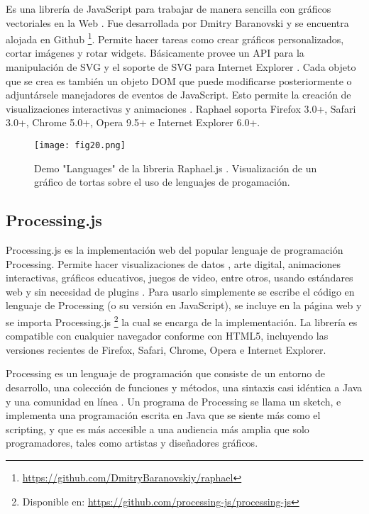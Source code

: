 Es una librería de JavaScript para trabajar de manera sencilla con gráficos vectoriales en la Web \cite{RaphJS}. Fue desarrollada por Dmitry Baranovski y se encuentra alojada en Github \footnote{\url{https://github.com/DmitryBaranovskiy/raphael}}. Permite hacer tareas como crear gráficos personalizados, cortar imágenes y rotar widgets. Básicamente provee un API para la manipulación de SVG y el soporte de SVG para Internet Explorer \cite{Bar09}. Cada objeto que se crea es también un objeto DOM que puede modificarse posteriormente o adjuntársele manejadores de eventos de JavaScript. Esto permite la creación de visualizaciones interactivas y animaciones . Raphael soporta Firefox 3.0+, Safari 3.0+, Chrome 5.0+, Opera 9.5+ e Internet Explorer 6.0+.

\begin{figure}[htp]
  \centering
  \texttt{[image: fig20.png]}
  \caption[Demo "Languages" de la libreria Raphael.js]{Demo "Languages" de la libreria Raphael.js \protect\footnotemark. Visualización de un gráfico de tortas sobre el uso de lenguajes de progamación.}
  \label{fig:fig20}
\end{figure}


\subsection{Processing.js}

Processing.js es la implementación web del popular lenguaje de programación Processing. Permite hacer visualizaciones de datos , arte digital, animaciones interactivas, gráficos educativos, juegos de video, entre otros, usando estándares web y sin necesidad de plugins \cite{ProcJS}. Para usarlo simplemente se escribe el código en lenguaje de Processing (o su versión en JavaScript), se incluye en la página web y se importa Processing.js \footnote{Disponible en: \url{https://github.com/processing-js/processing-js}} la cual se encarga de la implementación. La librería es compatible con cualquier navegador conforme con HTML5, incluyendo las versiones recientes de Firefox, Safari, Chrome, Opera e Internet Explorer.

Processing es un lenguaje de programación que consiste de un entorno de desarrollo, una colección de funciones y métodos, una sintaxis casi idéntica a Java y una comunidad en línea \cite{Fry07}. Un programa de Processing se llama un sketch, e implementa una programación escrita en Java que se siente más como el scripting, y que es más accesible a una audiencia más amplia que solo programadores, tales como artistas y diseñadores gráficos.


